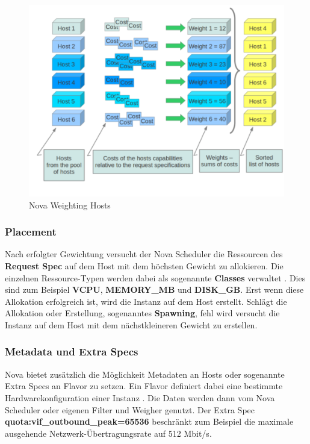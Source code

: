 \documentclass[../Main.tex]{subfiles}
\begin{document}
\begin{figure}[h]
    \centering
    \includegraphics[width=0.9\columnwidth]{Images/nova-weighting-hosts.png}
    \caption{Nova Weighting Hosts \citep{ComputeSchedulers}}
\end{figure}

\subsubsection{Placement}
\label{chapter:PlacementAPI}

Nach erfolgter Gewichtung versucht der Nova Scheduler die Ressourcen des \textbf{Request Spec} auf dem Host mit
dem höchsten Gewicht zu allokieren. Die einzelnen Ressource-Typen werden dabei als sogenannte \textbf{Classes} verwaltet \citep{PlacementDocs}.
Dies sind zum Beispiel \textbf{VCPU}, \textbf{{MEMORY\_MB}} und \textbf{{DISK\_GB}}. Erst wenn diese
Allokation erfolgreich ist, wird die Instanz auf dem Host erstellt. Schlägt die Allokation oder Erstellung, sogenanntes \textbf{Spawning}, fehl wird versucht
die Instanz auf dem Host mit dem nächstkleineren Gewicht zu erstellen.

\subsubsection{Metadata und Extra Specs}

Nova bietet zusätzlich die Möglichkeit Metadaten an Hosts oder sogenannte Extra Specs an Flavor zu setzen. Ein Flavor definiert
dabei eine bestimmte Hardwarekonfiguration einer Instanz \citep{FlavorDocs}. Die Daten werden dann vom Nova Scheduler
oder eigenen Filter und Weigher genutzt. Der Extra Spec \textbf{quota:vif\_outbound\_peak=65536} beschränkt zum Beispiel die maximale ausgehende Netzwerk-Übertragungsrate auf 512 Mbit/s.
\end{document}
